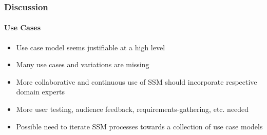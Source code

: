 \documentclass{beamer}
\begin{document}

\begin{frame}
  \frametitle{Discussion}
  \framesubtitle{Use Cases}
  \begin{itemize}
    \item Use case model seems justifiable at a high level
    \item Many use cases and variations are missing
    \item More collaborative and continuous use of SSM should incorporate respective domain experts
    \item More user testing, audience feedback, requirements-gathering, etc. needed
    \item Possible need to iterate SSM processes towards a collection of use case models
  \end{itemize}
\end{frame}
\end{document}
